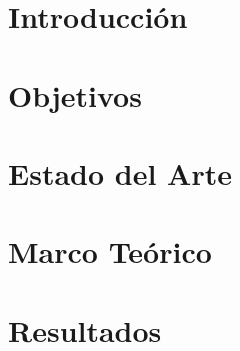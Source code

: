 \documentclass[a4paper,12pt]{book}
\theoremstyle{break}
\begin{document}
\parskip 10pt

\onehalfspacing





\thispagestyle{empty}



\newpage
\newpage
\thispagestyle{empty}
\null
\newpage

\pagestyle{fancy}
\tableofcontents


\newpage
\pagestyle{fancy}

%

\chapter{Introducción}\label{chapter:02}


\chapter{Objetivos}\label{objetivos}


\chapter{Estado del Arte}\label{chapter:03}


\chapter{Marco Teórico}\label{chapter:04}




\chapter{Resultados}\label{chapter:06}

\end{document}

